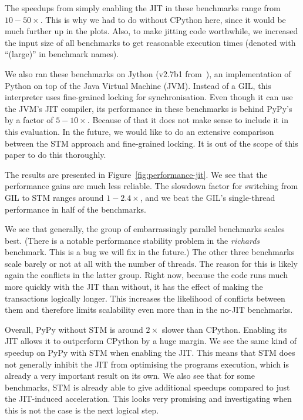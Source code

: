 \documentclass{sigplanconf}
\begin{document}
The speedups from simply enabling the JIT in these benchmarks range from
$10-50\times$. This is why we had to do without CPython here, since it
would be much further up in the plots. Also, to make jitting
code worthwhile, we increased the input size of all benchmarks to get
reasonable execution times (denoted with ``(large)'' in benchmark names).

We also ran these benchmarks on Jython (v2.7b1 from~\cite{webjython}),
an implementation of Python on top of the
Java Virtual Machine (JVM).  Instead of a GIL, this interpreter uses
fine-grained locking for synchronisation. Even though it can use the
JVM's JIT compiler, its performance in these benchmarks is behind
PyPy's by a factor of $5-10\times$. Because of that it does not
make sense to include it in this evaluation. In the future, we would
like to do an extensive comparison between the STM approach and
fine-grained locking. It is out of the scope of this paper to do
this thoroughly.

The results are presented in Figure~\ref{fig:performance-jit}. We see
that the performance gains are much less reliable.  The slowdown
factor for switching from GIL to STM ranges around $1-2.4\times$, and
we beat the GIL's single-thread performance in half of the benchmarks.

We see that generally, the group of embarrassingly parallel benchmarks
scales best. (There is a notable performance stability problem in the
\emph{richards} benchmark. This is a bug we will fix in the future.)
The other three benchmarks scale barely or not at all with the number of
threads. The reason for this is likely again the conflicts in the
latter group. Right now, because the code runs much more quickly with
the JIT than without, it has the effect of making the transactions
logically longer.  This increases the
likelihood of conflicts between them and therefore limits scalability
even more than in the no-JIT benchmarks.

Overall, PyPy without STM is around $2\times$ slower than CPython.
Enabling its JIT allows it to outperform CPython by a huge margin.
We see the same kind of speedup on PyPy with STM when enabling the
JIT. This means that STM does not generally inhibit the JIT from
optimising the programs execution, which is already a very important
result on its own. We also see that for some
benchmarks, STM is already able to give additional speedups
compared to just the JIT-induced acceleration. This looks very
promising and investigating when this is not the case is the next
logical step.
\end{document}
